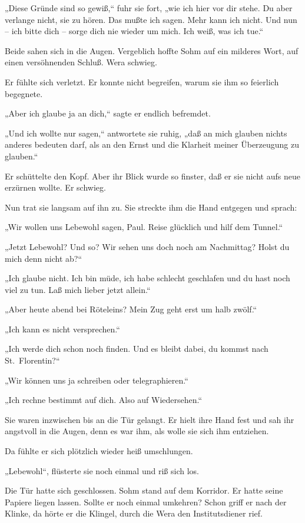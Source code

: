 „Diese Gründe sind so gewiß,“ fuhr sie fort, „wie ich hier vor dir
stehe. Du aber verlange nicht, sie zu hören. Das mußte ich sagen.
Mehr kann ich nicht. Und nun – ich bitte dich – sorge dich nie
wieder um mich. Ich weiß, was ich tue.“

Beide sahen sich in die Augen. Vergeblich hoffte Sohm auf ein
milderes Wort, auf einen versöhnenden Schluß. Wera schwieg.

Er fühlte sich verletzt. Er konnte nicht begreifen, warum sie ihm
so feierlich begegnete.

„Aber ich glaube ja an dich,“ sagte er endlich befremdet.

„Und ich wollte nur sagen,“ antwortete sie ruhig, „daß an mich
glauben nichts anderes bedeuten darf, als an den Ernst und die
Klarheit meiner Überzeugung zu glauben.“

Er schüttelte den Kopf. Aber ihr Blick wurde so finster, daß er sie
nicht aufs neue erzürnen wollte. Er schwieg.

Nun trat sie langsam auf ihn zu. Sie streckte ihm die Hand entgegen
und sprach:

„Wir wollen uns Lebewohl sagen, Paul. Reise glücklich und hilf dem
Tunnel.“

„Jetzt Lebewohl? Und so? Wir sehen uns doch noch am Nachmittag?
Holst du mich denn nicht ab?“

„Ich glaube nicht. Ich bin müde, ich habe schlecht geschlafen und
du hast noch viel zu tun. Laß mich lieber jetzt allein.“

„Aber heute abend bei Röteleins? Mein Zug geht erst um halb
zwölf.“

„Ich kann es nicht versprechen.“

„Ich werde dich schon noch finden. Und es bleibt dabei, du kommst
nach St.~Florentin?“

„Wir können uns ja schreiben oder telegraphieren.“

„Ich rechne bestimmt auf dich. Also auf Wiedersehen.“

Sie waren inzwischen bis an die Tür gelangt. Er hielt ihre Hand
fest und sah ihr angstvoll in die Augen, denn es war ihm, als wolle
sie sich ihm entziehen.

Da fühlte er sich plötzlich wieder heiß umschlungen.

„Lebewohl“, flüsterte sie noch einmal und riß sich los.

Die Tür hatte sich geschlossen. Sohm stand auf dem Korridor. Er
hatte seine Papiere liegen lassen. Sollte er noch einmal umkehren?
Schon griff er nach der Klinke, da hörte er die Klingel, durch die
Wera den Institutsdiener rief.

